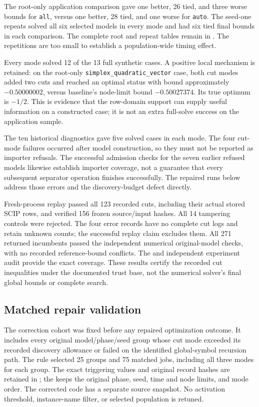 The root-only application comparison gave one better, 26 tied, and three
worse bounds for \texttt{all}, versus one better, 28 tied, and one worse
for \texttt{auto}. The seed-one repeats solved all six
selected models in every mode and had six tied final bounds in each
comparison. The complete root and repeat tables remain in
.
The repetitions are too small to establish a population-wide timing effect.

Every mode solved 12 of the 13 full synthetic cases. A positive local
mechanism is retained: on the root-only \texttt{simplex\_quadratic\_vector}
case, both cut modes added two cuts and reached an optimal status with
bound approximately $-0.50000002$, versus baseline's node-limit bound
$-0.50027374$. Its true optimum is $-1/2$. This is evidence that the
row-domain support can supply useful information on a constructed case;
it is not an extra full-solve success on the application sample.

The ten historical diagnostics gave five solved cases in each mode.
The four cut-mode failures occurred after model construction, so they
must not be reported as importer refusals. The successful admission
checks for the seven earlier refused models likewise establish importer
coverage, not a guarantee that every subsequent separator operation
finishes successfully. The repaired runs below address those errors
and the discovery-budget defect directly.

Fresh-process replay passed all 123 recorded cuts, including their actual
stored SCIP rows, and verified 156 frozen source/input hashes. All 14
tampering controls were rejected. The four error records have no complete
cut logs and retain unknown counts; the successful replay claim excludes
them. All 271 returned incumbents passed the independent numerical
original-model checks, with no recorded reference-bound conflicts. The
 and
independent experiment audit provide the exact coverage. These results
certify the recorded cut inequalities under the documented trust base,
not the numerical solver's final global bounds or complete search.

\subsection{Matched repair validation}

The correction cohort was fixed before any repaired optimization outcome.
It includes every original model/phase/seed group whose cut mode exceeded
its recorded discovery allowance or failed on the identified global-symbol
recursion path. The rule selected 25 groups and 75 matched jobs, including
all three modes for each group. The exact triggering values and original
record hashes are retained in
; the
keeps the original phase, seed, time and node limits, and mode order.
The corrected code has a separate source snapshot. No activation
threshold, instance-name filter, or selected population is retuned.

